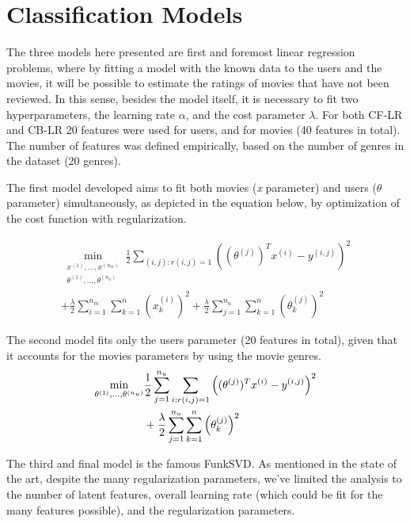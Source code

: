 \documentclass[conference]{IEEEtran}
\begin{document}
\section{Classification Models}

The three models here presented are first and foremost linear regression problems, where by fitting a model with the known data to the users and the movies, it will be possible to estimate the ratings of movies that have not been reviewed. In this sense, besides the model itself, it is necessary to fit two hyperparameters, the learning rate $\alpha$, and the cost parameter $\lambda$. For both CF-LR and CB-LR 20 features were used for users, and for movies (40 features in total). The number of features was defined empirically, based on the number of genres in the dataset (20 genres).

The first model developed aims to fit both movies (\textit{x} parameter) and users ($\theta$ parameter) simultaneously, as depicted in the equation below, by optimization of the cost function with regularization.

\begin{multline}
\min_{\substack{x^{(1)}, \dots, x^{(n_m)} \\ \theta^{(1)}, \dots, \theta^{(n_u)}}} 
\frac{1}{2} \sum_{(i, j) : r(i, j) = 1} \left( (\theta^{(j)})^T x^{(i)} - y^{(i,j)} \right)^2 \\
+ \frac{\lambda}{2} \sum_{i=1}^{n_m} \sum_{k=1}^{n} \left( x_k^{(i)} \right)^2 + \frac{\lambda}{2} \sum_{j=1}^{n_u} \sum_{k=1}^{n} \left( \theta_k^{(j)} \right)^2
\end{multline}



The second model fits only the users parameter (20 features in total), given that it accounts for the movies parameters by using the movie genres.
\begin{align}
\min_{\theta^{(1)}, \dots, \theta^{(n_u)}} 
&\frac{1}{2} \sum_{j=1}^{n_u} \sum_{i : r(i, j) = 1} \left( (\theta^{(j)})^T x^{(i)} - y^{(i,j)} \right)^2 \notag \\
&+ \frac{\lambda}{2} \sum_{j=1}^{n_u} \sum_{k=1}^{n} \left( \theta_k^{(j)} \right)^2
\end{align}

The third and final model is the famous FunkSVD. As mentioned in the state of the art, despite the many regularization parameters, we've limited the analysis to the number of latent features, overall learning rate (which could be fit for the many features possible), and the regularization parameters.
\end{document}

